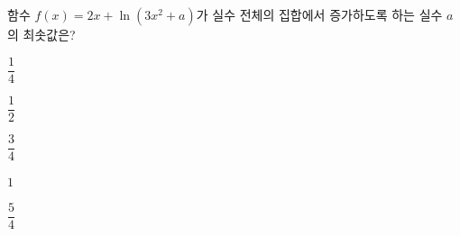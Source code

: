 함수 $f(x)=2x+\ln(3x^2+a)$가 실수 전체의 집합에서 증가하도록 하는 실수 $a$의 최솟값은?
\begin{choices32}{\rule[-3ex]{0pt}{8ex}$\dfrac{1}{4}$}{\rule[-3ex]{0pt}{8ex}$\dfrac{1}{2}$}{\rule[-3ex]{0pt}{8ex}$\dfrac{3}{4}$}{\rule[-3ex]{0pt}{8ex}$1$}{\rule[-3ex]{0pt}{8ex}$\dfrac{5}{4}$}\end{choices32}
